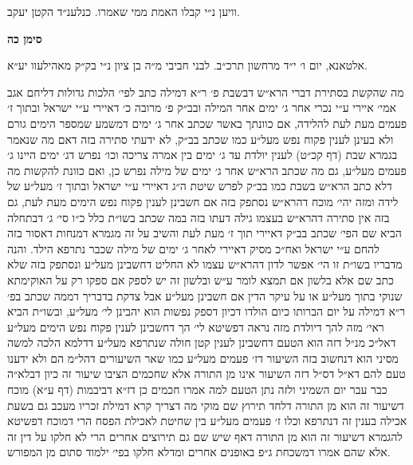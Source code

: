 \documentclass[12pt, openany]{book}
\newcommand{\chapname}{}
\newcommand{\newchap}[1]{
	\addcontentsline{toc}{chapter}{#1}
	\renewcommand{\chapname}{#1}
		\begin{center}
			\textbf{%
\fontsize{16pt}{16pt}\selectfont
				#1}
		\end{center}
}
\begin{document}
\begin{multicols}{2}
וויען נ״י קבלו האמת ממי שאמרו. כנלענ״ד הקטן יעקב.\\\vspace{0pt}

\end{multicols}\newpage

\newchap{סימן כה}
\begin{multicols}{2}
אלטאנא, יום ו׳ י״ד מרחשון תרכ״ב. לבני חביבי מ״ה בן ציון נ״י בק״ק מאהילעוו יע״א.\\\vspace{0pt}

מה שהקשת בסתירת דברי הרא״ש דבשבת פ׳ ר״א דמילה כתב לפי׳ הלכות גדולות דליחם אגב אמי׳ איירי ע״י נכרי אחר ג׳ ימים אחר המילה ובב״ק פ׳ מרובה כ׳ דאיירי ע״י ישראל ובתוך ז׳ פעמים מעת לעת להלידה, אם כוונתך באשר שכתב אחר ג׳ ימים דמשמע שמספר הימים גורם ולא בעינן לענין פקוח נפש מעל״ע כמו שכתב בב״ק, לא ידעתי סתירה בזה דאם מה שנאמר בגמרא שבת (דף קכ״ט) לענין יולדת עד ג׳ ימים בין אמרה צריכה וכו׳ נפרש דג׳ ימים היינו ג׳ פעמים מעל״ע, גם מה שכתב הרא״ש אחר ג׳ ימים של מילה נפרש כן, ואם כוונת להקשות מה דלא כתב הרא״ש בשבת כמו בב״ק לפרש שיטת ה״ג דאיירי ע״י ישראל ובתוך ז׳ מעל״ע של לידה ומזה יהי׳ מוכח דהרא״ש נסתפק בזה אם חשבינן לענין פקוח נפש הימים מעת לעת, גם בזה אין סתירה דהרא״ש בעצמו גילה דעתו בזה במה שכתב בשו״ת כלל כ״ו סי׳ ג׳ דבתחלה הביא שם הפי׳ שכתב בב״ק דאיירי תוך ז׳ מעת לעת והשיב על זה מגמרא דמנחות דאסור בזה להחם ע״י ישראל ואח״כ מסיק דאיירי לאחר ג׳ ימים של מילה שכבר נתרפא הילד. והנה מדבריו בשו״ת זו הי׳ אפשר לדון דהרא״ש עצמו לא החליט דחשבינן מעל״ע ונסתפק בזה שלא כתב שם אלא בלשון אם תמצא לומר ע״ש ובלשון זה יש לספק אם ספקו רק על האוקימתא שנוקי בתוך מעל״ע או על עיקר הדין אם חשבינן מעל״ע אבל צדקת בדבריך דממה שכתב בפ׳ ר״א דמילה על יום הברותו כיום הולדו דכיון דספק נפשות הוא יהבינן לי׳ מעל״ע, ובשו״ת הביא ראי׳ מזה להך דיולדת מזה נראה דפשיטא לי׳ הך דחשבינן לענין פקוח נפש הימים מעל״ע דאל״כ מנ״ל דזה הוא הטעם דחשבינן לענין קטן חולה שנתרפא מעל״ע דדלמא הלכה למשה מסיני הוא דנחשוב בזה השיעור דז׳ פעמים מעל״ע כמו שאר השיעורים דהל״מ הם ולא ידענו טעם להם דא״ל דס״ל דזה השיעור אינו מן התורה אלא שחכמים הציבו שיעור זה כיון דבלא״ה כבר עבר יום השמיני ולזה נתן הטעם למה אמרו חכמים כן דז״א דביבמות (דף ע״א) מוכח דשיעור זה הוא מן התורה דלחד תירוץ שם מוקי מה דצריך קרא דמילת זכריו מעכב גם בשעת אכילה בענין זה דנתרפא וכלו ז׳ פעמים מעל״ע בין שחיטת לאכילת הפסח הרי דמוכח דפשיטא להגמרא דשיעור זה הוא מן התורה דאף שיש שם גם תירוצים אחרים הרי לא חלקו על דין זה אלא שהם אמרו דמשכחת ג״פ באופנים אחרים ומדלא חלקו בפי׳ ילמוד סתום מן המפורש.\\\vspace{0pt}


\end{multicols}
\end{document}
